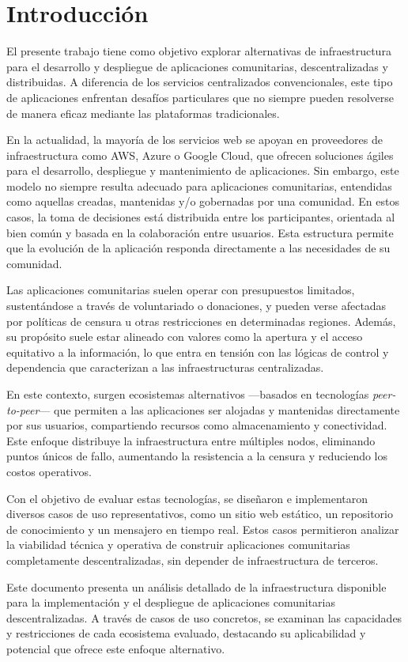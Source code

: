\section{Introducción}

El presente trabajo tiene como objetivo explorar alternativas de infraestructura para el desarrollo y despliegue de aplicaciones comunitarias, descentralizadas y distribuidas. A diferencia de los servicios centralizados convencionales, este tipo de aplicaciones enfrentan desafíos particulares que no siempre pueden resolverse de manera eficaz mediante las plataformas tradicionales.

En la actualidad, la mayoría de los servicios web se apoyan en proveedores de infraestructura como AWS, Azure o Google Cloud, que ofrecen soluciones ágiles para el desarrollo, despliegue y mantenimiento de aplicaciones. Sin embargo, este modelo no siempre resulta adecuado para aplicaciones comunitarias, entendidas como aquellas creadas, mantenidas y/o gobernadas por una comunidad. En estos casos, la toma de decisiones está distribuida entre los participantes, orientada al bien común y basada en la colaboración entre usuarios. Esta estructura permite que la evolución de la aplicación responda directamente a las necesidades de su comunidad.

Las aplicaciones comunitarias suelen operar con presupuestos limitados, sustentándose a través de voluntariado o donaciones, y pueden verse afectadas por políticas de censura u otras restricciones en determinadas regiones. Además, su propósito suele estar alineado con valores como la apertura y el acceso equitativo a la información, lo que entra en tensión con las lógicas de control y dependencia que caracterizan a las infraestructuras centralizadas.

En este contexto, surgen ecosistemas alternativos —basados en tecnologías \textit{peer-to-peer}— que permiten a las aplicaciones ser alojadas y mantenidas directamente por sus usuarios, compartiendo recursos como almacenamiento y conectividad. Este enfoque distribuye la infraestructura entre múltiples nodos, eliminando puntos únicos de fallo, aumentando la resistencia a la censura y reduciendo los costos operativos.

Con el objetivo de evaluar estas tecnologías, se diseñaron e implementaron diversos casos de uso representativos, como un sitio web estático, un repositorio de conocimiento y un mensajero en tiempo real. Estos casos permitieron analizar la viabilidad técnica y operativa de construir aplicaciones comunitarias completamente descentralizadas, sin depender de infraestructura de terceros.

Este documento presenta un análisis detallado de la infraestructura disponible para la implementación y el despliegue de aplicaciones comunitarias descentralizadas. A través de casos de uso concretos, se examinan las capacidades y restricciones de cada ecosistema evaluado, destacando su aplicabilidad y potencial que ofrece este enfoque alternativo.